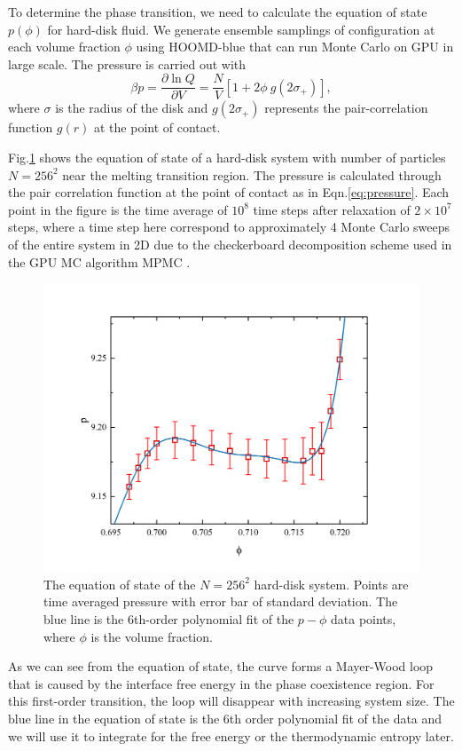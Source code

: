 \documentclass[a4paper]{article}
\begin{document}
To determine the phase transition, we need to calculate the equation of state $p(\phi)$ for hard-disk fluid. We generate ensemble samplings of configuration at each volume fraction $\phi$ using HOOMD-blue that can run Monte Carlo on GPU in large scale. The pressure is carried out with\cite{PhysRevE.87.042134}
\begin{equation} \label{eq:pressure}
\beta p = \frac{\partial \ln Q}{\partial V} = \frac{N}{V} \left[ 1 + 2 \phi ~ g(2\sigma_+) \right] ,
\end{equation}
where $\sigma$ is the radius of the disk and $g(2\sigma_+)$ represents the pair-correlation function $g(r)$ at the point of contact. 

Fig.\ref{fig:p_phi} shows the equation of state of a hard-disk system with number of particles $N=256^2$ near the melting transition region. The pressure is calculated through the pair correlation function at the point of contact as in Eqn.\ref{eq:pressure}. Each point in the figure is the time average of $10^8$ time steps after relaxation of $2 \times 10^7$ steps, where a time step here correspond to approximately 4 Monte Carlo sweeps of the entire system in 2D due to the checkerboard decomposition scheme used in the GPU MC algorithm MPMC \cite{ANDERSON201327}. 

\begin{figure}[ht]
	\centering
	\includegraphics[width=0.7\linewidth]{p_phi.png}
	\caption{
		The equation of state of the $N=256^2$ hard-disk system. Points are time averaged pressure with error bar of standard deviation. The blue line is the 6th-order polynomial fit of the $p-\phi$ data points, where $\phi$ is the volume fraction.
	}
	\label{fig:p_phi}
\end{figure}

As we can see from the equation of state, the curve forms a Mayer-Wood loop that is caused by the interface free energy in the phase coexistence region. For this first-order transition, the loop will disappear with increasing system size. The blue line in the equation of state is the 6th order polynomial fit of the data and we will use it to integrate for the free energy or the thermodynamic entropy later.
\end{document}
